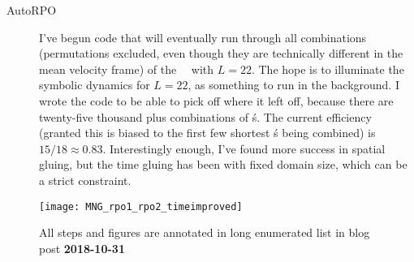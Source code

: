 \begin{description}
{\begin{description}
\item[AutoRPO]
I've begun code that will eventually run through all combinations (permutations excluded, even though they are technically
different in the mean velocity frame) of the \rpo\ \twots\ with $L=22$. The hope is to illuminate the symbolic dynamics for
$L=22$, as something to run in the background. I wrote the code to be able to pick off where it left off, because there
are twenty-five thousand plus combinations of \rpo\'s. The current efficiency (granted this is biased to the first few shortest
\rpo\'s being combined) is $15/18 \approx 0.83 $. Interestingly enough, I've found more success in spatial gluing, but the time gluing
has been with fixed domain size, which can be a strict constraint.
\end{description}
}

\begin{figure}
\centering
\begin{minipage}[height=.35\textheight]{.98\textwidth}
\texttt{[image: MNG\_rpo1\_rpo2\_timeimproved]}
\end{minipage}
\caption{ \label{fig:MNG-rpo1-rpo2-timeimproved}
All steps and figures are annotated in long enumerated list in blog post \textbf{2018-10-31}
}
\end{figure}

\end{description}
